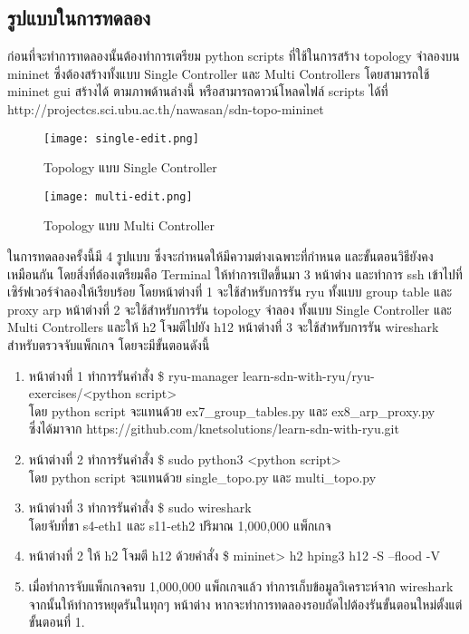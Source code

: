 \subsection{รูปแบบในการทดลอง}
\indent\indent
ก่อนที่จะทำการทดลองนั้นต้องทำการเตรียม python scripts ที่ใช้ในการสร้าง topology จำลองบน mininet
ซึ่งต้องสร้างทั้งแบบ Single Controller และ Multi Controllers โดยสามารถใช้ mininet gui สร้างได้ ตามภาพด้านล่างนี้
หรือสามารถดาวน์โหลดไฟล์ scripts ได้ที่ http://projectcs.sci.ubu.ac.th/nawasan/sdn-topo-mininet
\\
\begin{figure}[h!]
    \centering
    \texttt{[image: single-edit.png]}
    \caption{Topology แบบ Single Controller}
    \label{img:topo_cs}
\end{figure}

\begin{figure}[h!]
    \centering
    \texttt{[image: multi-edit.png]}
    \caption{Topology แบบ Multi Controller}
    \label{img:topo_cm}
\end{figure}

ในการทดลองครั้งนี้มี 4 รูปแบบ ซึ่งจะกำหนดให้มีความต่างเฉพาะที่กำหนด และขั้นตอนวิธียังคงเหมือนกัน
โดยสิ่งที่ต้องเตรียมคือ Terminal ให้ทำการเปิดขึ้นมา 3 หน้าต่าง และทำการ ssh เข้าไปที่เซิร์ฟเวอร์จำลองให้เรียบร้อย 
โดยหน้าต่างที่ 1 จะใช้สำหรับการรัน \gls{ryu} ทั้งแบบ group table และ proxy arp 
หน้าต่างที่ 2 จะใช้สำหรับการรัน topology จำลอง ทั้งแบบ Single Controller และ Multi Controllers 
และให้ h2 โจมตีไปยัง h12
หน้าต่างที่ 3 จะใช้สำหรับการรัน wireshark สำหรับตรวจจับแพ็กเกจ
โดยจะมีขั้นตอนดังนี้

\begin{enumerate}
    \item หน้าต่างที่ 1 ทำการรันคำสั่ง
    \$ ryu-manager learn-sdn-with-ryu/ryu-exercises/<python script> \\โดย python script จะแทนด้วย ex7\_group\_tables.py และ ex8\_arp\_proxy.py 
    \\ซึ่งได้มาจาก https://github.com/knetsolutions/learn-sdn-with-ryu.git
    \item หน้าต่างที่ 2 ทำการรันคำสั่ง
    \$ sudo python3 <python script> \\
    โดย python script จะแทนด้วย single\_topo.py และ multi\_topo.py 
    \item หน้าต่างที่ 3 ทำการรันคำสั่ง
    \$ sudo wireshark \\
    โดยจับที่ขา s4-eth1 และ s11-eth2 ปริมาณ 1,000,000 แพ็กเกจ
    \item หน้าต่างที่ 2 ให้ h2 โจมตี h12 ด้วยคำสั่ง \$ mininet> h2 hping3 h12 -S --flood -V
    \item เมื่อทำการจับแพ็กเกจครบ 1,000,000 แพ็กเกจแล้ว ทำการเก็บข้อมูลวิเคราะห์จาก wireshark จากนั้นให้ทำการหยุดรันในทุกๆ หน้าต่าง หากจะทำการทดลองรอบถัดไปต้องรันขั้นตอนใหม่ตั้งแต่ขั้นตอนที่ 1.
\end{enumerate}

